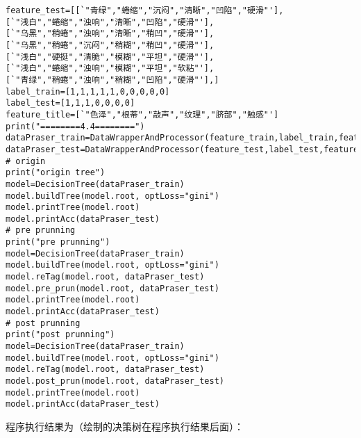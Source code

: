 \documentclass{ctexart}
\begin{document}
\begin{lstlisting}
feature_test=[[`"青绿","蜷缩","沉闷","清晰","凹陷","硬滑"'],
[`"浅白","蜷缩","浊响","清晰","凹陷","硬滑"'],
[`"乌黑","稍蜷","浊响","清晰","稍凹","硬滑"'],
[`"乌黑","稍蜷","沉闷","稍糊","稍凹","硬滑"'],
[`"浅白","硬挺","清脆","模糊","平坦","硬滑"'],
[`"浅白","蜷缩","浊响","模糊","平坦","软粘"'],
[`"青绿","稍蜷","浊响","稍糊","凹陷","硬滑"'],]
label_train=[1,1,1,1,1,0,0,0,0,0]
label_test=[1,1,1,0,0,0,0]
feature_title=[`"色泽","根蒂","敲声","纹理","脐部","触感"']
print("========4.4========")
dataPraser_train=DataWrapperAndProcessor(feature_train,label_train,feature_title)
dataPraser_test=DataWrapperAndProcessor(feature_test,label_test,feature_title)
# origin
print("origin tree")
model=DecisionTree(dataPraser_train)
model.buildTree(model.root, optLoss="gini")
model.printTree(model.root)
model.printAcc(dataPraser_test)
# pre prunning
print("pre prunning")
model=DecisionTree(dataPraser_train)
model.buildTree(model.root, optLoss="gini")
model.reTag(model.root, dataPraser_test)
model.pre_prun(model.root, dataPraser_test)
model.printTree(model.root)
model.printAcc(dataPraser_test)
# post prunning
print("post prunning")
model=DecisionTree(dataPraser_train)
model.buildTree(model.root, optLoss="gini")
model.reTag(model.root, dataPraser_test)
model.post_prun(model.root, dataPraser_test)
model.printTree(model.root)
model.printAcc(dataPraser_test)
\end{lstlisting}
程序执行结果为（绘制的决策树在程序执行结果后面）：
\end{document}

